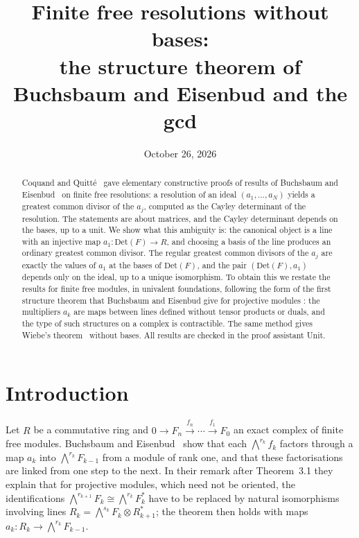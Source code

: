 \documentclass[11pt]{amsart}
\title[Finite free resolutions without bases]{Finite free resolutions without bases:\\ the structure theorem of Buchsbaum and Eisenbud and the gcd}
\date{October 26, 2026}
\theoremstyle{definition}
\theoremstyle{remark}
\newcommand{\Det}{\mathrm{Det}}
\newcommand{\Ex}{{\textstyle\bigwedge}}
\begin{document}
\begin{abstract}
Coquand and Quitt\'e~\cite{CQ} gave elementary constructive proofs of
results of Buchsbaum and Eisenbud~\cite{BE73,BE74} on finite free
resolutions: a resolution of an ideal $(a_1,\dots,a_N)$ yields a greatest
common divisor of the $a_j$, computed as the Cayley determinant of the
resolution.  The statements are about matrices, and the Cayley determinant
depends on the bases, up to a unit.  We show what this ambiguity is: the
canonical object is a line with an injective map $a_1:\Det(F)\to R$, and
choosing a basis of the line produces an ordinary greatest common divisor.
The regular greatest common divisors of the $a_j$ are exactly the values of
$a_1$ at the bases of $\Det(F)$, and the pair $(\Det(F),a_1)$ depends only
on the ideal, up to a unique isomorphism.  To obtain this we restate the
results for finite free modules, in univalent foundations, following the
form of the first structure theorem that Buchsbaum and Eisenbud give for
projective modules \cite[Theorem~3.1 and the Remark after it]{BE74}: the
multipliers $a_k$ are maps between lines defined without tensor products
or duals, and the type of such structures on a complex is contractible.
The same method gives Wiebe's theorem~\cite{CT} without bases.  All
results are checked in the proof assistant Unit.
\end{abstract}
\maketitle

\section{Introduction}

Let $R$ be a commutative ring and $0\to F_n\xrightarrow{f_n}\cdots
\xrightarrow{f_1}F_0$ an exact complex of finite free modules.
Buchsbaum and Eisenbud~\cite[Theorem~3.1]{BE74} show that each
$\Ex^{r_k}f_k$ factors through a map $a_k$ into $\Ex^{r_k}F_{k-1}$
from a module of rank one, and that these factorisations are linked from
one step to the next.  In their remark after Theorem~3.1 they explain
that for projective modules, which need not be oriented, the
identifications $\Ex^{r_{k+1}}F_k\cong\Ex^{r_k}F_k^*$ have to be replaced
by natural isomorphisms involving lines
$R_k=\Ex^{s_k}F_k\otimes R_{k+1}^*$; the theorem then holds with maps
$a_k:R_k\to\Ex^{r_k}F_{k-1}$.
\end{document}
